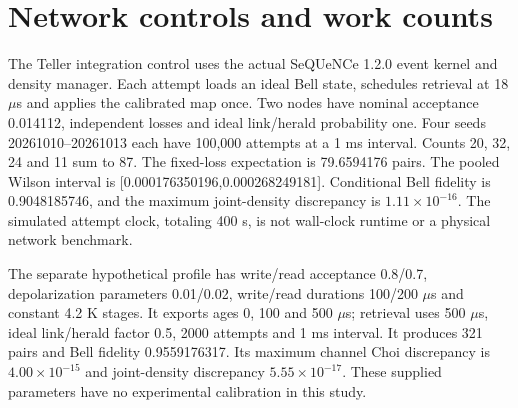 \documentclass[10pt,a4paper]{article}
\begin{document}
\section{Network controls and work counts}
The Teller integration control uses the actual SeQUeNCe 1.2.0 event kernel and density manager. Each attempt loads an ideal Bell state, schedules retrieval at 18 $\mu$s and applies the calibrated map once. Two nodes have nominal acceptance 0.014112, independent losses and ideal link/herald probability one. Four seeds 20261010--20261013 each have 100,000 attempts at a 1 ms interval. Counts 20, 32, 24 and 11 sum to 87. The fixed-loss expectation is 79.6594176 pairs. The pooled Wilson interval is [0.000176350196,0.000268249181]. Conditional Bell fidelity is 0.9048185746, and the maximum joint-density discrepancy is $1.11\times10^{-16}$. The simulated attempt clock, totaling 400 s, is not wall-clock runtime or a physical network benchmark.

The separate hypothetical profile has write/read acceptance 0.8/0.7, depolarization parameters 0.01/0.02, write/read durations 100/200 $\mu$s and constant 4.2 K stages. It exports ages 0, 100 and 500 $\mu$s; retrieval uses 500 $\mu$s, ideal link/herald factor 0.5, 2000 attempts and 1 ms interval. It produces 321 pairs and Bell fidelity 0.9559176317. Its maximum channel Choi discrepancy is $4.00\times10^{-15}$ and joint-density discrepancy $5.55\times10^{-17}$. These supplied parameters have no experimental calibration in this study.
\end{document}
